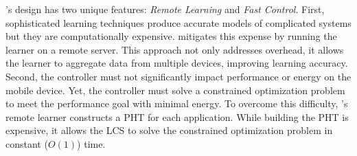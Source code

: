 {

\SYSTEM{}'s design has two unique features: \textit{Remote Learning}
and \textit{Fast Control}. First, sophisticated learning techniques
produce accurate models of complicated systems but they are
computationally expensive.  \SYSTEM{} mitigates this expense by
running the learner on a remote server. This approach not only
addresses overhead, it allows the learner to aggregate data from
multiple devices, improving learning accuracy. Second, the controller
must not significantly impact performance or energy on the mobile
device.  Yet, the controller must solve a constrained optimization
problem to meet the performance goal with minimal energy.  To overcome
this difficulty, \SYSTEM{}'s remote learner constructs a PHT for each
application.  While building the PHT is expensive, it allows the LCS
to solve the constrained optimization problem in constant ($O(1)$)
time.

}
